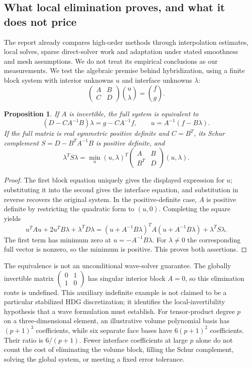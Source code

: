 \documentclass[11pt]{article}
\newtheorem{proposition}{Proposition}
\begin{document}
\subsection{What local elimination proves, and what it does not price}
The report already compares high-order methods through interpolation estimates, local solves, sparse direct-solver work and adaptation under stated smoothness and mesh assumptions. We do not treat its empirical conclusions as our measurements. We test the algebraic premise behind hybridization, using a finite block system with interior unknowns $u$ and interface unknowns $\lambda$:
\[
\begin{pmatrix}A&B\\C&D\end{pmatrix}\binom u\lambda=\binom f g.
\]
\begin{proposition}
If $A$ is invertible, the full system is equivalent to
\[
(D-CA^{-1}B)\lambda=g-CA^{-1}f,\qquad u=A^{-1}(f-B\lambda).
\]
If the full matrix is real symmetric positive definite and $C=B^T$, its Schur complement $S=D-B^TA^{-1}B$ is positive definite, and
\[
\lambda^TS\lambda=\min_u (u,\lambda)^T\begin{pmatrix}A&B\\B^T&D\end{pmatrix}(u,\lambda).
\]
\end{proposition}
\begin{proof}
The first block equation uniquely gives the displayed expression for $u$; substituting it into the second gives the interface equation, and substitution in reverse recovers the original system. In the positive-definite case, $A$ is positive definite by restricting the quadratic form to $(u,0)$. Completing the square yields
\[
u^TAu+2u^TB\lambda+\lambda^TD\lambda
=(u+A^{-1}B\lambda)^TA(u+A^{-1}B\lambda)+\lambda^TS\lambda.
\]
The first term has minimum zero at $u=-A^{-1}B\lambda$. For $\lambda\ne0$ the corresponding full vector is nonzero, so the minimum is positive. This proves both assertions.
\end{proof}
The equivalence is not an unconditional wave-solver guarantee. The globally invertible matrix $\begin{pmatrix}0&1\\1&0\end{pmatrix}$ has singular interior block $A=0$, so this elimination route is undefined. This auxiliary indefinite example is not claimed to be a particular stabilized HDG discretization; it identifies the local-invertibility hypothesis that a wave formulation must establish.
For tensor-product degree $p$ on a three-dimensional element, an illustrative volume polynomial basis has $(p+1)^3$ coefficients, while six separate face bases have $6(p+1)^2$ coefficients. Their ratio is $6/(p+1)$. Fewer interface coefficients at large $p$ alone do not count the cost of eliminating the volume block, filling the Schur complement, solving the global system, or meeting a fixed error tolerance.
\end{document}

